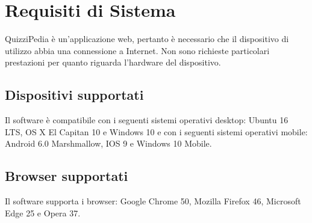 \newpage
\section{Requisiti di Sistema}
QuizziPedia è un'applicazione web, pertanto è necessario che il dispositivo di utilizzo abbia una connessione a Internet. Non sono richieste particolari prestazioni per quanto riguarda l'hardware del dispositivo.
\subsection{Dispositivi supportati}
Il software \progetto{} è compatibile con i seguenti sistemi operativi desktop: Ubuntu 16 LTS, OS X El Capitan 10 e Windows 10 e con i seguenti sistemi operativi mobile: Android 6.0 Marshmallow, IOS 9 e Windows 10 Mobile.
\subsection{Browser supportati}
Il software \progetto{} supporta i browser: Google Chrome 50, Mozilla Firefox 46, Microsoft Edge 25 e Opera 37.